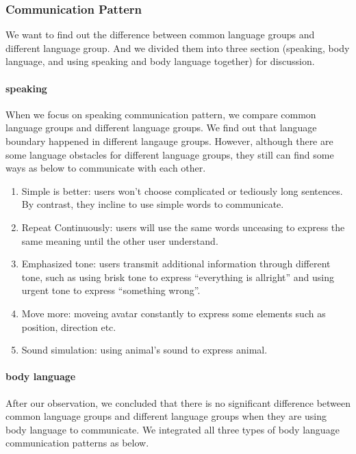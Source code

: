 \subsubsection{Communication Pattern}
We want to find out the difference between common language groups and different language group. And we divided them into three section (speaking, body language, and using speaking and body language together) for discussion.

\paragraph{speaking}
When we focus on speaking communication pattern, we compare common language groups and different language groups. We find out that language boundary happened in different langauge groups. However, although there are some language obstacles for different language groups, they still can find some ways as below to communicate with each other.

\begin{enumerate}
  \item Simple is better: users won't choose complicated or tediously long sentences. By contrast, they incline to use simple words to communicate. 

  \item Repeat Continuously: users will use the same words unceasing to express the same meaning until the other user understand.
  
  \item Emphasized tone: users transmit additional information through different tone, such as using brisk tone to express ``everything is allright'' and using urgent tone to express ``something wrong''.
  
  \item Move more: moveing avatar constantly to express some elements such as position, direction etc.
  
  \item Sound simulation: using animal's sound to express animal.
\end{enumerate}

\paragraph{body language}
After our observation, we concluded that there is no significant difference between common language groups and different language groups when they are using body language to communicate. We integrated all three types of body language communication patterns as below.

